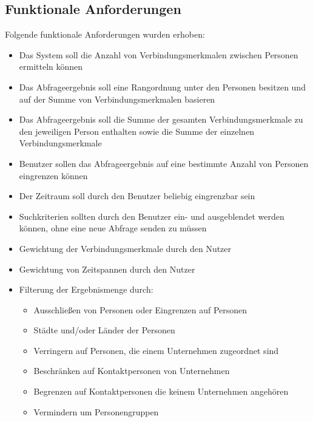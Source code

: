 \subsection{Funktionale Anforderungen}

Folgende funktionale Anforderungen wurden erhoben:

\begin{itemize}
\item Das System soll die Anzahl von Verbindungsmerkmalen zwischen Personen ermitteln können

\item Das Abfrageergebnis soll eine Rangordnung unter den Personen besitzen und auf der Summe von Verbindungsmerkmalen basieren

\item Das Abfrageergebnis soll die Summe der gesamten Verbindungsmerkmale zu den jeweiligen Person enthalten sowie die Summe der einzelnen Verbindungsmerkmale

\item Benutzer sollen das Abfrageergebnis auf eine bestimmte Anzahl von Personen eingrenzen können

\item Der Zeitraum soll durch den Benutzer beliebig eingrenzbar sein

\item Suchkriterien sollten durch den Benutzer ein- und ausgeblendet werden können, ohne eine neue Abfrage senden zu müssen

\item Gewichtung der Verbindungsmerkmale durch den Nutzer

\item Gewichtung von Zeitspannen durch den Nutzer

\item Filterung der Ergebnismenge durch:	
	\begin{itemize}
	\item Ausschließen von Personen oder Eingrenzen auf Personen
	\item Städte und/oder Länder der Personen
	\item Verringern auf Personen, die einem Unternehmen zugeordnet sind 
	\item Beschränken auf Kontaktpersonen von Unternehmen
	\item Begrenzen auf Kontaktpersonen die keinem Unternehmen angehören
	\item Vermindern um Personengruppen
	\end{itemize}
\end{itemize}

